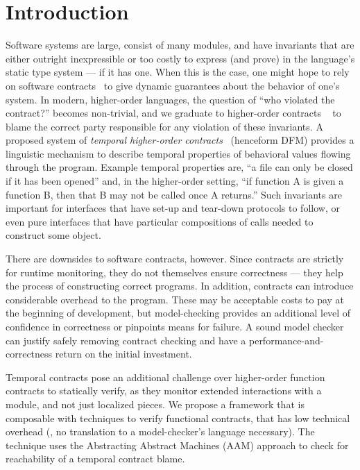 \section{Introduction}

Software systems are large, consist of many modules, and have invariants that are either outright inexpressible or too costly to express (and prove) in the language's static type system --- if it has one.
%
When this is the case, one might hope to rely on software contracts~\cite{dvanhorn:meyer-eiffel} to give dynamic guarantees about the behavior of one's system.
%
In modern, higher-order languages, the question of ``who violated the contract?'' becomes non-trivial, and we graduate to higher-order contracts ~\citep{dvanhorn:Findler2002Contracts} to blame the correct party responsible for any violation of these invariants.
%
A proposed system of \emph{temporal higher-order contracts}~\citep{ianjohnson:dfm:icfp2011} (henceform DFM) provides a linguistic mechanism to describe temporal properties of behavioral values flowing through the program.
%
%
Example temporal properties are, ``a file can only be closed if it has been opened'' and, in the higher-order setting, ``if function A is given a function B, then that B may not be called once A returns.''
%
Such invariants are important for interfaces that have set-up and tear-down protocols to follow, or even pure interfaces that have particular compositions of calls needed to construct some object.

There are downsides to software contracts, however.
%
Since contracts are strictly for runtime monitoring, they do not themselves ensure correctness --- they help the process of constructing correct programs.
%
In addition, contracts can introduce considerable overhead to the program.
%
These may be acceptable costs to pay at the beginning of development, but model-checking provides an additional level of confidence in correctness or pinpoints means for failure.
%
A sound model checker can justify safely removing contract checking and have a performance-and-correctness return on the initial investment.

Temporal contracts pose an additional challenge over higher-order function contracts to statically verify, as they monitor extended interactions with a module, and not just localized pieces.
%
We propose a framework that is composable with techniques to verify functional contracts, that has low technical overhead (\eg, no translation to a model-checker's language necessary).
%
The technique uses the Abstracting Abstract Machines (AAM) approach \citep{dvanhorn:VanHorn2010Abstracting} to check for reachability of a temporal contract blame.

